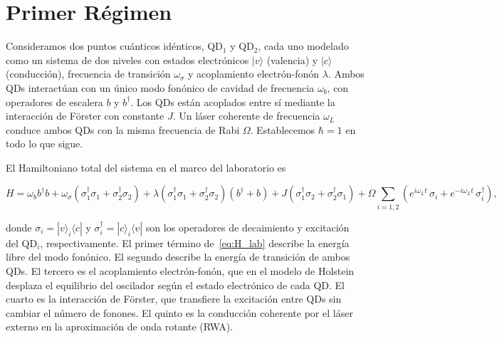 \documentclass[12pt]{article}
\begin{document}
\section{Primer Régimen}
	
	Consideramos dos puntos cu\'anticos id\'enticos, QD$_1$ y QD$_2$, cada uno
	modelado como un sistema de dos niveles con estados electr\'onicos $|v\rangle$
	(valencia) y $|c\rangle$ (conducci\'on), frecuencia de transici\'on $\omega_\sigma$
	y acoplamiento electr\'on-fon\'on $\lambda$. Ambos QDs interact\'uan con un
	\'unico modo fon\'onico de cavidad de frecuencia $\omega_b$, con operadores de
	escalera $b$ y $b^\dagger$. Los QDs est\'an acoplados entre s\'i mediante la
	interacci\'on de F\"orster con constante $J$. Un l\'aser coherente de frecuencia
	$\omega_L$ conduce ambos QDs con la misma frecuencia de Rabi $\Omega$.
	Establecemos $\hbar = 1$ en todo lo que sigue.
	
	El Hamiltoniano total del sistema en el marco del laboratorio es
	
	\begin{equation}
		H
		= \omega_b b^\dagger b
		+ \omega_\sigma \left(\sigma_1^\dagger \sigma_1 + \sigma_2^\dagger \sigma_2\right)
		+ \lambda \left(\sigma_1^\dagger \sigma_1 + \sigma_2^\dagger \sigma_2\right)(b^\dagger + b)
		+ J\left(\sigma_1^\dagger \sigma_2 + \sigma_2^\dagger \sigma_1\right)
		+ \Omega \sum_{i=1,2} \left(e^{i\omega_L t}\,\sigma_i + e^{-i\omega_L t}\,\sigma_i^\dagger\right),
		\label{eq:H_lab}
	\end{equation}
	
	donde $\sigma_i = |v\rangle_i\langle c|$ y $\sigma_i^\dagger = |c\rangle_i\langle v|$
	son los operadores de decaimiento y excitaci\'on del QD$_i$, respectivamente.
	El primer t\'ermino de~\eqref{eq:H_lab} describe la energ\'ia libre del modo
	fon\'onico. El segundo describe la energ\'ia de transici\'on de ambos QDs. El
	tercero es el acoplamiento electr\'on-fon\'on, que en el modelo de Holstein
	desplaza el equilibrio del oscilador seg\'un el estado electr\'onico de cada QD.
	El cuarto es la interacci\'on de F\"orster, que transfiere la excitaci\'on
	entre QDs sin cambiar el n\'umero de fonones. El quinto es la conducci\'on
	coherente por el l\'aser externo en la aproximaci\'on de onda rotante (RWA).
	
	
\end{document}
